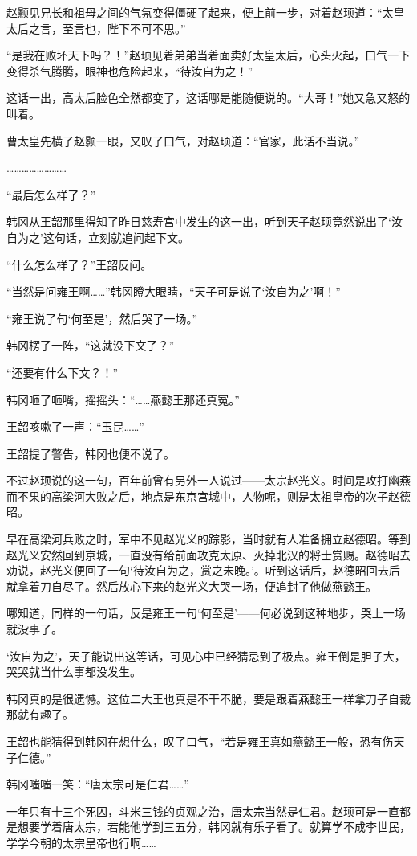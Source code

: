 赵颢见兄长和祖母之间的气氛变得僵硬了起来，便上前一步，对着赵顼道：“太皇太后之言，至言也，陛下不可不思。”

“是我在败坏天下吗？！”赵顼见着弟弟当着面卖好太皇太后，心头火起，口气一下变得杀气腾腾，眼神也危险起来，“待汝自为之！”

这话一出，高太后脸色全然都变了，这话哪是能随便说的。“大哥！”她又急又怒的叫着。

曹太皇先横了赵颢一眼，又叹了口气，对赵顼道：“官家，此话不当说。”

……………………

“最后怎么样了？”

韩冈从王韶那里得知了昨日慈寿宫中发生的这一出，听到天子赵顼竟然说出了‘汝自为之’这句话，立刻就追问起下文。

“什么怎么样了？”王韶反问。

“当然是问雍王啊……”韩冈瞪大眼睛，“天子可是说了‘汝自为之’啊！”

“雍王说了句‘何至是’，然后哭了一场。”

韩冈楞了一阵，“这就没下文了？”

“还要有什么下文？！”

韩冈咂了咂嘴，摇摇头：“……燕懿王那还真冤。”

王韶咳嗽了一声：“玉昆……”

王韶提了警告，韩冈也便不说了。

不过赵顼说的这一句，百年前曾有另外一人说过——太宗赵光义。时间是攻打幽燕而不果的高梁河大败之后，地点是东京宫城中，人物呢，则是太祖皇帝的次子赵德昭。

早在高梁河兵败之时，军中不见赵光义的踪影，当时就有人准备拥立赵德昭。等到赵光义安然回到京城，一直没有给前面攻克太原、灭掉北汉的将士赏赐。赵德昭去劝说，赵光义便回了一句‘待汝自为之，赏之未晚。’。听到这话后，赵德昭回去后就拿着刀自尽了。然后放心下来的赵光义大哭一场，便追封了他做燕懿王。

哪知道，同样的一句话，反是雍王一句‘何至是’——何必说到这种地步，哭上一场就没事了。

‘汝自为之’，天子能说出这等话，可见心中已经猜忌到了极点。雍王倒是胆子大，哭哭就当什么事都没发生。

韩冈真的是很遗憾。这位二大王也真是不干不脆，要是跟着燕懿王一样拿刀子自裁那就有趣了。

王韶也能猜得到韩冈在想什么，叹了口气，“若是雍王真如燕懿王一般，恐有伤天子仁德。”

韩冈嗤嗤一笑：“唐太宗可是仁君……”

一年只有十三个死囚，斗米三钱的贞观之治，唐太宗当然是仁君。赵顼可是一直都是想要学着唐太宗，若能他学到三五分，韩冈就有乐子看了。就算学不成李世民，学学今朝的太宗皇帝也行啊……

